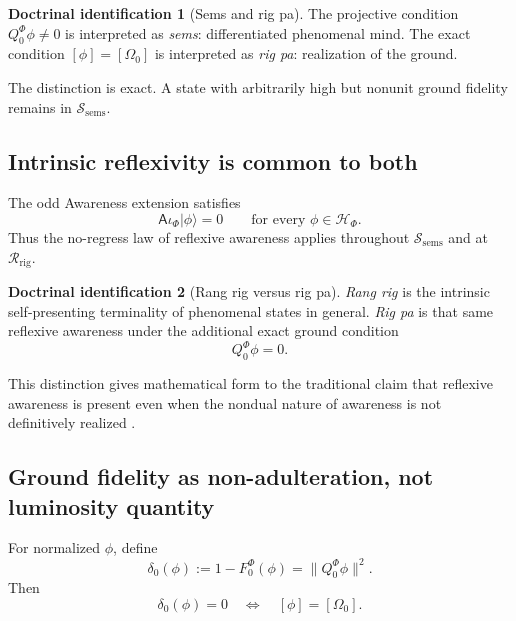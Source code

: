 \documentclass[11pt,reqno]{scrartcl}
\newcommand{\scrHF}{\mathscr H_{\Phi}}
\newcommand{\QzeroF}{Q_{0}^{\Phi}}
\newcommand{\Aodd}{\mathsf A}
\newcommand{\iF}{\iota_{\Phi}}
\newcommand{\ket}[1]{\lvert #1\rangle}
\newcommand{\semsSet}{\mathscr S_{\mathrm{sems}}}
\newcommand{\rigRay}{\mathscr R_{\mathrm{rig}}}
\theoremstyle{plain}
\theoremstyle{definition}
\newtheorem{identification}[identification]{Doctrinal identification}
\theoremstyle{remark}
\begin{document}
\begin{identification}[Sems and rig pa]
\label{id:sems-rigpa}
The projective condition $\QzeroF\phi\neq0$ is interpreted as
\emph{sems}: differentiated phenomenal mind.  The exact condition
$[\phi]=[\Omega_0]$ is interpreted as \emph{rig pa}: realization of the
ground.
\end{identification}

The distinction is exact.  A state with arbitrarily high but nonunit ground
fidelity remains in $\semsSet$.

\subsection{Intrinsic reflexivity is common to both}

The odd Awareness extension satisfies
\begin{equation}
  \Aodd\iF\ket\phi=0
  \qquad
  \text{for every }\phi\in\scrHF.
  \label{eq:all-phenomenal-terminal}
\end{equation}
Thus the no-regress law of reflexive awareness applies throughout
$\semsSet$ and at $\rigRay$.

\begin{identification}[Rang rig versus rig pa]
\label{id:rangrig-rigpa}
\emph{Rang rig} is the intrinsic self-presenting terminality of phenomenal
states in general.  \emph{Rig pa} is that same reflexive awareness under the
additional exact ground condition
\begin{equation}
  \QzeroF\phi=0.
  \label{eq:rigpa-additional-condition}
\end{equation}
\end{identification}

This distinction gives mathematical form to the traditional claim that
reflexive awareness is present even when the nondual nature of awareness is
not definitively realized \cite[pp.~424--425]{Yiannopoulos2020}.

\subsection{Ground fidelity as non-adulteration, not luminosity quantity}

For normalized $\phi$, define
\begin{equation}
  \delta_0(\phi)
  :=1-F_0^{\Phi}(\phi)
  =\|\QzeroF\phi\|^2.
  \label{eq:adulteration-functional}
\end{equation}
Then
\begin{equation}
  \delta_0(\phi)=0
  \quad\Longleftrightarrow\quad
  [\phi]=[\Omega_0].
  \label{eq:adulteration-zero-ground}
\end{equation}
\end{document}
